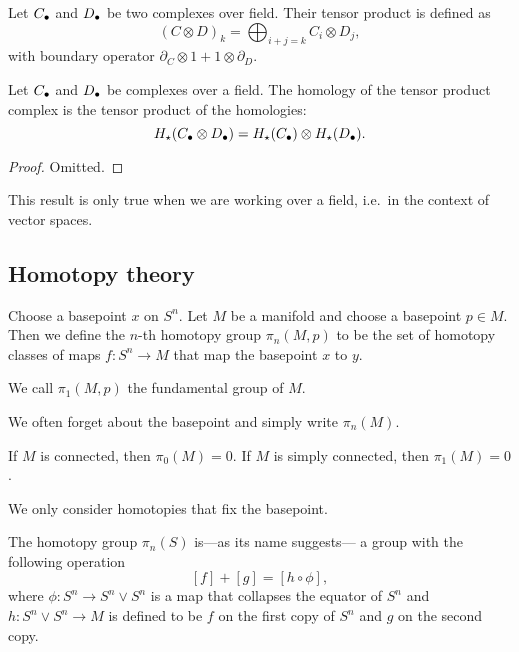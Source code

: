 \begin{definition}
    Let $C_\bullet$ and  $D_\bullet$ be two complexes over field. Their tensor product is defined as
     \[
         (C \otimes D)_k = \bigoplus_{i+j = k} C_i \otimes D_j
    ,\] 
    with boundary operator $\partial_C \otimes 1 + 1 \otimes\partial_D$.
\end{definition}
\begin{prop}
    Let $C_\bullet$ and  $D_\bullet$ be complexes over a field.
    The homology of the tensor product complex is the tensor product of the homologies:
    \[
        H_\star(C_\bullet \otimes D_\bullet) = H_\star(C_\bullet) \otimes H_\star(D_\bullet)
    .\] 
    \label{prop:hom-tensor-is-tensor-hom}
\end{prop}
\begin{proof}
    Omitted.
\end{proof}
\begin{remark}
    This result is only true when we are working over a field, i.e.\ in the context of vector spaces.
\end{remark}


\subsection*{Homotopy theory}

\begin{definition}
    Choose a basepoint $x$ on $S^{n}$.
    Let $M$ be a manifold and choose a basepoint $p \in M$.
    Then we define the $n$-th homotopy group $\pi_n(M, p)$ to be the set of homotopy classes of maps  $f: S^{n} \to  M$ that map the basepoint $x$ to $y$.
\end{definition}
\begin{remark}
    We call $\pi_1(M, p)$ the fundamental group of $M$.
\end{remark}
\begin{remark}
    We often forget about the basepoint and simply write $\pi_n(M)$.
\end{remark}
\begin{eg}
    If $M$ is connected, then  $\pi_0(M) = 0$.
    If  $M$ is simply connected, then  $\pi_1(M) = 0$.
\end{eg}
\begin{remark}
    We only consider homotopies that fix the basepoint.
\end{remark}
\begin{prop}
    The homotopy group $\pi_n(S)$ is---as its name suggests--- a group with the following operation
    \[
        [f] + [g] = [h  \circ  \phi]
    ,\] 
    where $\phi : S^{n} \to  S^{n} \vee S^{n}$ is a map that collapses the equator of $S^{n}$ and $h : S^{n} \vee S^{n} \to  M$ is defined to be $f$ on the first copy of  $S^{n}$ and $g$ on the second copy.
\end{prop}


